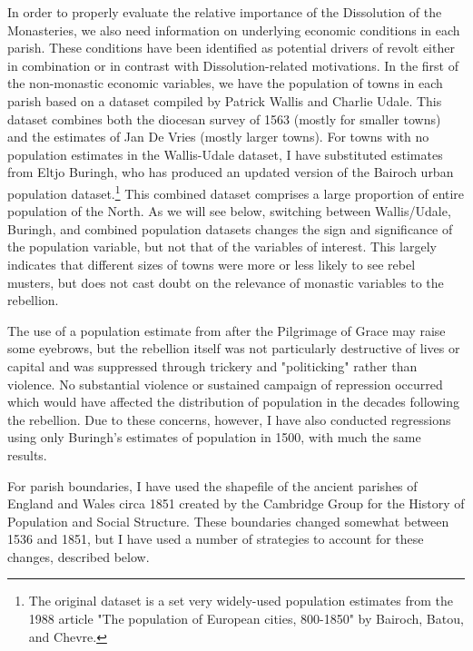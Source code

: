 \documentclass[12pt]{article}
\begin{document}
In order to properly evaluate the relative importance of the Dissolution of the Monasteries, we also need information on underlying economic conditions in each parish. These conditions have been identified as potential drivers of revolt either in combination or in contrast with Dissolution-related motivations. In the first of the non-monastic economic variables, we have the population of towns in each parish based on a dataset compiled by Patrick Wallis and Charlie Udale. This dataset combines both the diocesan survey of 1563 (mostly for smaller towns) and the estimates of Jan De Vries (mostly larger towns). For towns with no population estimates in the Wallis-Udale dataset, I have substituted estimates from Eltjo Buringh, who has produced an updated version of the Bairoch urban population dataset.\footnote{The original dataset is a set very widely-used population estimates from the 1988 article "The population of European cities, 800-1850" by Bairoch, Batou, and Chevre.} This combined dataset comprises a large proportion of entire population of the North. As we will see below, switching between Wallis/Udale, Buringh, and combined population datasets changes the sign and significance of the population variable, but not that of the variables of interest. This largely indicates that different sizes of towns were more or less likely to see rebel musters, but does not cast doubt on the relevance of monastic variables to the rebellion.

The use of a population estimate from after the Pilgrimage of Grace may raise some eyebrows, but the rebellion itself was not particularly destructive of lives or capital and was suppressed through trickery and "politicking" rather than violence. No substantial violence or sustained campaign of repression occurred which would have affected the distribution of population in the decades following the rebellion. Due to these concerns, however, I have also conducted regressions using only Buringh's estimates of population in 1500, with much the same results.

For parish boundaries, I have used the shapefile of the ancient parishes of England and Wales circa 1851 created by the Cambridge Group for the History of Population and Social Structure. These boundaries changed somewhat between 1536 and 1851, but I have used a number of strategies to account for these changes, described below.
\end{document}
